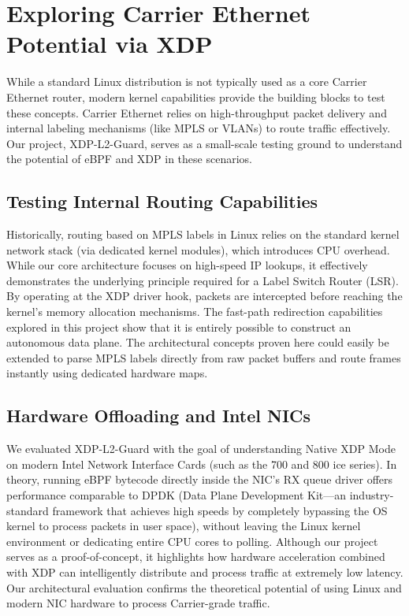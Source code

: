 \documentclass[11pt,a4paper]{article}
\begin{document}
\section{Exploring Carrier Ethernet Potential via XDP}

While a standard Linux distribution is not typically used as a core Carrier Ethernet router, modern kernel capabilities provide the building blocks to test these concepts.
Carrier Ethernet relies on high-throughput packet delivery and internal labeling mechanisms (like MPLS or VLANs) to route traffic effectively.
Our project, XDP-L2-Guard, serves as a small-scale testing ground to understand the potential of eBPF and XDP in these scenarios.

\subsection{Testing Internal Routing Capabilities}

Historically, routing based on MPLS labels in Linux relies on the standard kernel network stack (via dedicated kernel modules), which introduces CPU overhead.
While our core architecture focuses on high-speed IP lookups, it effectively demonstrates the underlying principle required for a Label Switch Router (LSR).
By operating at the XDP driver hook, packets are intercepted before reaching the kernel's memory allocation mechanisms.
The fast-path redirection capabilities explored in this project show that it is entirely possible to construct an autonomous data plane.
The architectural concepts proven here could easily be extended to parse MPLS labels directly from raw packet buffers and route frames instantly using dedicated hardware maps.

\subsection{Hardware Offloading and Intel NICs}

We evaluated XDP-L2-Guard with the goal of understanding Native XDP Mode on modern Intel Network Interface Cards (such as the 700 and 800 ice series).
In theory, running eBPF bytecode directly inside the NIC's RX queue driver offers performance comparable to DPDK (Data Plane Development Kit—an industry-standard framework that achieves high speeds by completely bypassing the OS kernel to process packets in user space), without leaving the Linux kernel environment or dedicating entire CPU cores to polling.
Although our project serves as a proof-of-concept, it highlights how hardware acceleration combined with XDP can intelligently distribute and process traffic at extremely low latency.
Our architectural evaluation confirms the theoretical potential of using Linux and modern NIC hardware to process Carrier-grade traffic.
\end{document}
